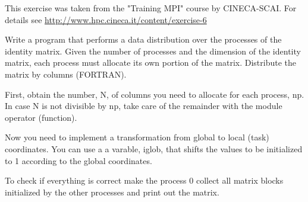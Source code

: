This exercise was taken from the "Training MPI" course by CINECA-SCAI. For
details see \url{http://www.hpc.cineca.it/content/exercise-6}

Write a program that performs a data distribution over the processes of the
identity matrix. Given the number of processes and the dimension of the identity
matrix, each process must allocate its own portion of the matrix. Distribute the
matrix by columns (FORTRAN).

First, obtain the number, N,  of columns you need to allocate for each
process, np. In case N is not divisible by np, take care of the remainder with
the module operator (function).

Now you need to implement a transformation from global to local (task)
coordinates. You can use a a varable, iglob, that shifts the values to be
initialized to 1 according to the global coordinates.

To check if everything is correct make the process 0 collect all matrix blocks
initialized by the other processes and print out the matrix.

